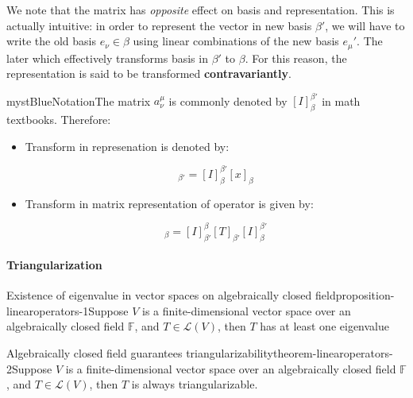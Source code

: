 We note that the matrix has \textit{opposite} effect on basis and representation. This is actually intuitive: in order to represent the vector in new basis $\beta'$, we will have to write the old basis $e_\nu \in \beta$ using linear combinations of the new basis $e_{\mu}'$. The later which effectively transforms basis in $\beta'$ to $\beta$. For this reason, the representation is said to be transformed \textbf{contravariantly}.

\begin{mystadmonition}{mystBlue}{Notation}The matrix $a_{\nu}^{\mu}$ is commonly denoted by $[I]_{\beta}^{\beta'}$ in math textbooks. Therefore:

\begin{itemize}
\item Transform in represenation is denoted by:

\begin{equation}
[x]_{\beta'}=[I]_{\beta}^{\beta'}[x]_{\beta}
\end{equation}


\item Transform in matrix representation of operator is given by:

\begin{equation}
[T]_{\beta}=[I]_{\beta'}^{\beta}[T]_{\beta'}[I]_{\beta}^{\beta'}
\end{equation}
\end{itemize}

\end{mystadmonition}
\paragraph{Triangularization}

\begin{mystthmproposition}{Existence of eigenvalue in vector spaces on algebraically closed field}{proposition-linearoperators-1}Suppose $V$ is a finite-dimensional vector space over an algebraically closed field $\mathbb{F}$, and $T\in \mathcal L(V)$, then $T$ has at least one eigenvalue

\end{mystthmproposition}
\begin{mystthmtheorem}{Algebraically closed field guarantees triangularizability}{theorem-linearoperators-2}Suppose $V$ is a finite-dimensional vector space over an algebraically closed field $\mathbb{F}$, and $T\in \mathcal L(V)$, then $T$ is always triangularizable.

\end{mystthmtheorem}